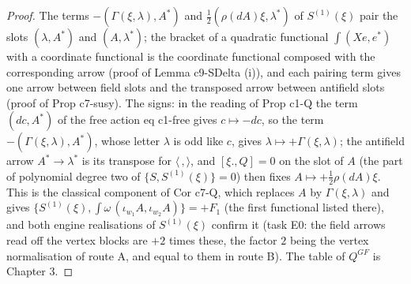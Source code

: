 \documentclass[11pt]{article}
\numberwithin{equation}{section}
\theoremstyle{plain}
\theoremstyle{definition}
\begin{document}
\begin{proof}
The terms $-(\Gamma(\xi,\lambda),A^*)$ and $\tfrac12(\rho(dA)\xi,\lambda^*)$ of $S^{(1)}(\xi)$ pair the slots $(\lambda,A^*)$ and $(A,\lambda^*)$; the bracket of a quadratic functional $\int(Xe,e^*)$ with a coordinate functional is the coordinate functional composed with the corresponding arrow (proof of Lemma c9-SDelta (i)), and each pairing term gives one arrow between field slots and the transposed arrow between antifield slots (proof of Prop c7-susy). The signs: in the reading of Prop c1-Q the term $(dc,A^*)$ of the free action eq c1-free gives $c\mapsto-dc$, so the term $-(\Gamma(\xi,\lambda),A^*)$, whose letter $\lambda$ is odd like $c$, gives $\lambda\mapsto+\Gamma(\xi,\lambda)$; the antifield arrow $A^*\to\lambda^*$ is its transpose for $\langle\,,\rangle$, and $[\xi.,Q]=0$ on the slot of $A$ (the part of polynomial degree two of $\{S,S^{(1)}(\xi)\}=0$) then fixes $A\mapsto+\tfrac12\rho(dA)\xi$. This is the classical component of Cor c7-Q, which replaces $A$ by $\Gamma(\xi,\lambda)$ and gives $\{S^{(1)}(\xi),\int\omega\,(\iota_{w_1}A,\iota_{w_2}A)\}=+F_1$ (the first functional listed there), and both engine realisations of $S^{(1)}(\xi)$ confirm it (task E0: the field arrows read off the vertex blocks are $+2$ times these, the factor $2$ being the vertex normalisation of route A, and equal to them in route B). The table of $Q^{GF}$ is Chapter 3.
\end{proof}
\end{document}
